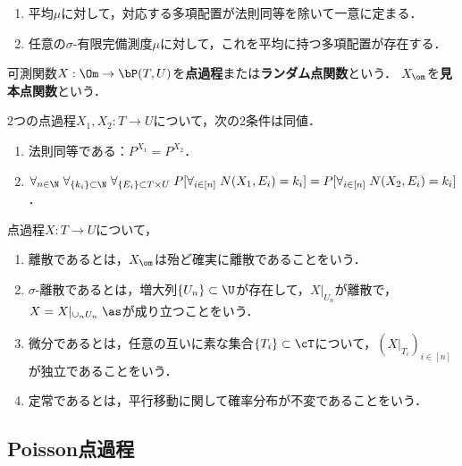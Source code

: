 \documentclass[uplatex,dvipdfmx]{jsreport}
\begin{document}
\begin{lemma}\mbox{}
    \begin{enumerate}
        \item 平均$\mu$に対して，対応する多項配置が法則同等を除いて一意に定まる．
        \item 任意の$\sigma$-有限完備測度$\mu$に対して，これを平均に持つ多項配置が存在する．
    \end{enumerate}
\end{lemma}

\begin{definition}
    可測関数$X:\Om\to \bP(T,U)$を\textbf{点過程}または\textbf{ランダム点関数}という．
    $X_\om$を\textbf{見本点関数}という．
\end{definition}

\begin{lemma}
    2つの点過程$X_1,X_2:T\to U$について，次の2条件は同値．
    \begin{enumerate}
        \item 法則同等である：$P^{X_1}=P^{X_2}$．
        \item $\forall_{n\in\N}\;\forall_{\{k_i\}\subset\N}\;\forall_{\{E_i\}\subset T\times U}\;P[\forall_{i\in[n]}\;N(X_1,E_i)=k_i]=P[\forall_{i\in[n]}\;N(X_2,E_i)=k_i]$．
    \end{enumerate}
\end{lemma}

\begin{definition}
    点過程$X:T\to U$について，
    \begin{enumerate}
        \item 離散であるとは，$X_\om$は殆ど確実に離散であることをいう．
        \item $\sigma$-離散であるとは，増大列$\{U_n\}\subset\U$が存在して，$X|_{U_n}$が離散で，$X=X|_{\cup_nU_n}\;\as$が成り立つことをいう．
        \item 微分であるとは，任意の互いに素な集合$\{T_i\}\subset\cT$について，$(X|_{T_i})_{i\in[n]}$が独立であることをいう．
        \item 定常であるとは，平行移動に関して確率分布が不変であることをいう．
    \end{enumerate}
\end{definition}

\subsection{Poisson点過程}
\end{document}
